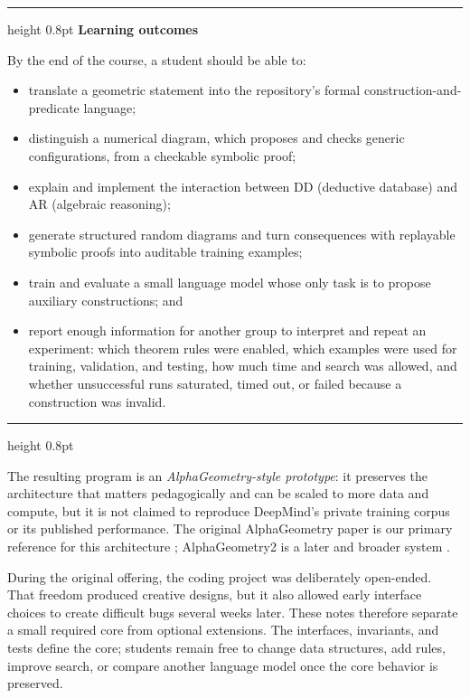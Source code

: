 \documentclass[reqno]{amsart}
\newenvironment{lecturebox}[1]{%
    \par\medskip
    \noindent\begingroup
    \setlength{\parindent}{0pt}
    \color{agblue}\hrule height 0.8pt\color{black}
    \smallskip
    \textbf{\color{agblue}#1}\par\smallskip
}{%
    \smallskip
    \color{agblue}\hrule height 0.8pt\color{black}
    \endgroup
    \medskip
}
\DeclareMathOperator{\1}{\textbf{1}}
\begin{document}
\begin{lecturebox}{Learning outcomes}
By the end of the course, a student should be able to:
\begin{itemize}
    \item translate a geometric statement into the repository's formal
          construction-and-predicate language;
    \item distinguish a numerical diagram, which proposes and checks generic
          configurations, from a checkable symbolic proof;
    \item explain and implement the interaction between DD
          (deductive database) and AR (algebraic reasoning);
    \item generate structured random diagrams and turn consequences with
          replayable symbolic proofs into auditable training examples;
    \item train and evaluate a small language model whose only task is to
          propose auxiliary constructions; and
    \item report enough information for another group to interpret and repeat
          an experiment: which theorem rules were enabled, which examples were
          used for training, validation, and testing, how much time and search
          was allowed, and whether unsuccessful runs saturated, timed out, or
          failed because a construction was invalid.
\end{itemize}
\end{lecturebox}

The resulting program is an \emph{AlphaGeometry-style prototype}: it preserves
the architecture that matters pedagogically and can be scaled to more data and
compute, but it is not claimed to reproduce DeepMind's private training corpus
or its published performance.  The original AlphaGeometry paper is our primary
reference for this architecture \cite{trinh2024solving}; AlphaGeometry2 is a
later and broader system \cite{chervonyi2025gold}.

During the original offering, the coding project was deliberately open-ended.
That freedom produced creative designs, but it also allowed early interface
choices to create difficult bugs several weeks later.  These notes therefore
separate a small required core from optional extensions.  The interfaces,
invariants, and tests define the core; students remain free to change data
structures, add rules, improve search, or compare another language model once
the core behavior is preserved.
\end{document}
